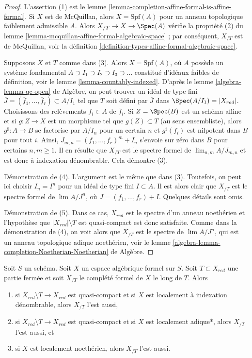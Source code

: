\begin{proof}
L'assertion (1) est le lemme \ref{lemma-completion-affine-formal-is-affine-formal}.
Si $X$ est de McQuillan, alors $X = \text{Spf}(A)$ pour un anneau topologique
faiblement admissible $A$. Alors $X_{/T} \to X \to \Spec(A)$ vérifie
la propriété (2) du lemme \ref{lemma-mcquillan-affine-formal-algebraic-space} ;
par conséquent, $X_{/T}$ est de McQuillan, voir la
définition \ref{definition-types-affine-formal-algebraic-space}.

\medskip\noindent
Supposons $X$ et $T$ comme dans (3).
Alors $X = \text{Spf}(A)$, où $A$ possède un système fondamental
$A \supset I_1 \supset I_2 \supset I_3 \supset \ldots$
constitué d'idéaux faibles de définition, voir le lemme \ref{lemma-countably-indexed}.
D'après le lemme \ref{algebra-lemma-qc-open} de Algèbre,
on peut trouver un idéal de type fini
$\overline{J} = (\overline{f}_1, \ldots, \overline{f}_r) \subset A/I_1$
tel que $T$ soit défini par $\overline{J}$ dans $\Spec(A/I_1) = |X_{red}|$.
Choisissons des relèvements $f_i \in A$ de $\overline{f}_i$.
Si $Z = \Spec(B)$ est un schéma affine et si $g : Z \to X$ est
un morphisme tel que $g(Z) \subset T$ (au sens ensembliste), alors
$g^\sharp : A \to B$ se factorise par $A/I_n$ pour un certain $n$
et $g^\sharp(f_i)$ est nilpotent dans $B$ pour tout $i$. Ainsi,
$J_{m, n} = (f_1, \ldots, f_r)^m + I_n$ s'envoie sur zéro dans $B$
pour certains $n, m \geq 1$. Il en résulte que $X_{/T}$ est le spectre formel de
$\lim_{n, m} A/J_{m, n}$ et est donc à indexation dénombrable.
Cela démontre (3).

\medskip\noindent
Démonstration de (4). L'argument est le même que dans (3).
Toutefois, on peut ici choisir $I_n = I^n$ pour un idéal de type fini
$I \subset A$. Il est alors clair que $X_{/T}$ est le spectre formel de
$\lim A/J^n$, où $J = (f_1, \ldots, f_r) + I$. Quelques détails sont omis.

\medskip\noindent
Démonstration de (5). Dans ce cas, $X_{red}$ est le spectre d'un anneau noethérien
et l'hypothèse que $|X_{red}| \setminus T$ est quasi-compact
est donc satisfaite. Comme dans la démonstration de (4), on voit alors que
$X_{/T}$ est le spectre de $\lim A/J^n$, qui est un anneau topologique
adique noethérien, voir le
lemme \ref{algebra-lemma-completion-Noetherian-Noetherian} de Algèbre.
\end{proof}

\begin{lemma}
\label{lemma-recompletion-types}
Soit $S$ un schéma. Soit $X$ un espace algébrique formel sur $S$.
Soit $T \subset X_{red}$ une partie fermée et soit $X_{/T}$
le complété formel de $X$ le long de $T$. Alors
\begin{enumerate}
\item si $X_{red} \setminus T \to X_{red}$ est quasi-compact et si $X$
est localement à indexation dénombrable, alors $X_{/T}$ l'est aussi,
\item si $X_{red} \setminus T \to X_{red}$ est quasi-compact et si $X$
est localement adique*, alors $X_{/T}$ l'est aussi, et
\item si $X$ est localement noethérien, alors $X_{/T}$ l'est aussi.
\end{enumerate}
\end{lemma}

